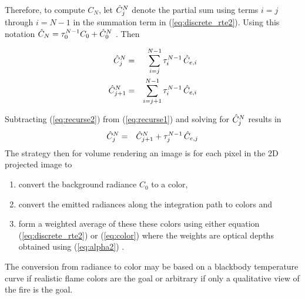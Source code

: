 Therefore, to compute $C_N$, let $\hat{C}_{j}^N$ denote the partial sum using terms $i=j$ through $i=N-1$ in the summation term in (\ref{eq:discrete_rte2}).  Using this notation $\hat{C}_N=\tau_{0}^{N-1}C_0+\hat{C}_{0}^N$ . Then

\begin{eqnarray}
\label{eq:recurse1}
\hat{C}_{j}^N &= &\sum_{i=j}^{N-1}\tau_{i}^{N-1}\,\hat{C}_{e,i}\\
\label{eq:recurse2}
\hat{C}_{j+1}^N     &= &\sum_{i=j+1}^{N-1}  \tau_{i}^{N-1}\,\hat{C}_{e,i}
\end{eqnarray}

Subtracting (\ref{eq:recurse2}) from (\ref{eq:recurse1}) and solving for $\hat{C}_{j}^N$ results in
\begin{eqnarray}
\label{eq:color}
\hat{C}_{j}^N&=&\hat{C}_{j+1}^N+\tau_{j}^{N-1}\,\hat{C}_{e,j}
\end{eqnarray}
The strategy then for volume rendering an image is for each pixel in the 2D projected image to
\begin{enumerate}
\item convert the background radiance $C_0$ to a color,
\item convert the emitted radiances along the integration path to colors and
\item form a weighted average of these these colors using either equation (\ref{eq:discrete_rte2}) or (\ref{eq:color}) where the weights are optical depths obtained using (\ref{eq:alpha2}) .
\end{enumerate}
The conversion from radiance to color may be based on a blackbody temperature curve if realistic flame colors are the goal or arbitrary if only a qualitative view of the fire is the goal.
